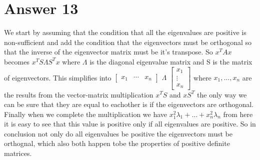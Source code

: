 \documentclass[12pt]{article}
\begin{document}
\section*{Answer 13}
We start by assuming that the condition that all the eigenvalues are positive is non-sufficient and add the condition that the eigenvectors must be orthogonal so that the inverse of the eigenvector matrix must be it's transpose. So $x^{T}Ax$ becomes $x^{T}S\Lambda S^{T}x$ where $\Lambda$ is the diagonal eigenvalue matrix and S is the matrix of eigenvectors. This simplifies into 
$\begin{bmatrix}
    x_{1}&
    \cdots&
    x_{n}
\end{bmatrix}
$
$\Lambda$
$\begin{bmatrix}
    x_{1}\\
    \vdots\\
    x_{n}
\end{bmatrix}
$ where $x_{1},...,x_{n}$ are the results from the vector-matrix multiplication $x^{T}S$ and $xS^{T}$ the only way we can be sure that they are equal to eachother is if the eigenvectors are orthogonal.
Finally when we complete the multiplication we have $x_{1}^{2}\lambda_{1}+...+x_{n}^{2}\lambda_{n}$ from here it is easy to see that this value is positive only if all eigenvalues are positive. So in conclusion not only do all eigenvalues be positive the eigenvectors must be orthognal, which also both happen tobe the properties of positive definite matrices.\\
\end{document}
